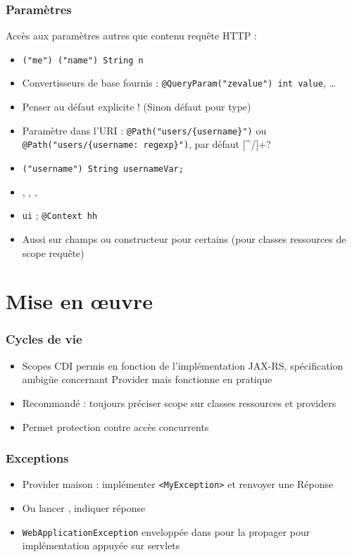 \documentclass[english, french]{beamer}
\begin{document}
\begin{frame}
	\frametitle{Paramètres}
	Accès aux paramètres autres que contenu requête HTTP :
	\begin{itemize}
		\item \texttt{("me") ("name") String n}
		\item Convertisseurs de base fournis : \texttt{@QueryParam("zevalue") int value}, …
		\item Penser au défaut explicite ! (Sinon défaut pour type)
		\item Paramètre dans l’URI : \texttt{@Path("users/\{username\}")} {\tiny ou \texttt{@Path("users/\{username: regexp\}")}, par défaut [\^{}/]+?}
		\item \texttt{("username") String usernameVar;}
		\item {}, , , 
		\item {}  \texttt{ui} ; \texttt{@Context  hh}
		\item Aussi sur champs {\tiny ou constructeur pour certains} (pour classes ressources de scope requête)
	\end{itemize}
\end{frame}

\section{Mise en œuvre}
\begin{frame}
	\frametitle{Cycles de vie}
	\begin{itemize}
		\item Scopes CDI permis {\tiny en fonction de l’implémentation JAX-RS,} {\tiny spécification ambigüe concernant Provider mais fonctionne en pratique}
		\item Recommandé : toujours préciser scope sur classes ressources et providers
		\item Permet protection contre accès concurrents
	\end{itemize}
\end{frame}

\begin{frame}
	\frametitle{Exceptions}
	\begin{itemize}
		\item Provider maison : implémenter \texttt{<MyException>} et renvoyer une Réponse
		\item Ou lancer , indiquer réponse
		\item \texttt{WebApplicationException} enveloppée dans  pour la propager {\tiny pour implémentation appuyée sur servlets}
	\end{itemize}
\end{frame}
\end{document}
